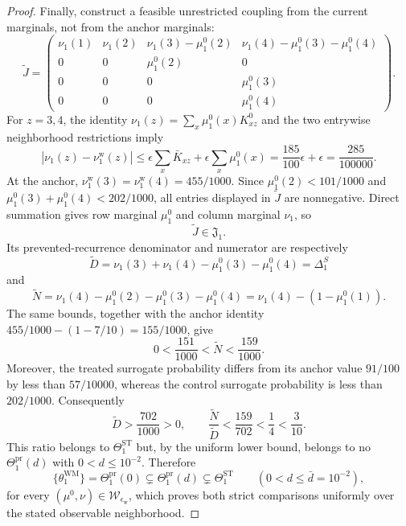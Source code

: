 \documentclass{article}
\begin{document}
\begin{proof}
Finally, construct a feasible unrestricted coupling from the current marginals, not from the anchor marginals:
\[
 \widetilde J=
 \begin{pmatrix}
 \nu_1(1)&\nu_1(2)&\nu_1(3)-\mu_1^0(2)&\nu_1(4)-\mu_1^0(3)-\mu_1^0(4)\\
 0&0&\mu_1^0(2)&0\\
 0&0&0&\mu_1^0(3)\\
 0&0&0&\mu_1^0(4)
 \end{pmatrix}.
\]
For \(z=3,4\), the identity \(\nu_1(z)=\sum_x\mu_1^0(x)K^0_{xz}\) and the two entrywise neighborhood restrictions imply
\[
 \left|\nu_1(z)-\nu_1^{\mathrm w}(z)\right|
 \le\epsilon\sum_x\bar K_{xz}+\epsilon\sum_x\mu_1^0(x)
 =\frac{185}{100}\epsilon+\epsilon
 =\frac{285}{100000}.
\]
At the anchor, \(\nu_1^{\mathrm w}(3)=\nu_1^{\mathrm w}(4)=455/1000\). Since \(\mu_1^0(2)<101/1000\) and \(\mu_1^0(3)+\mu_1^0(4)<202/1000\), all entries displayed in \(\widetilde J\) are nonnegative. Direct summation gives row marginal \(\mu_1^0\) and column marginal \(\nu_1\), so
\[
 \widetilde J\in\mathfrak J_1.
\]
Its prevented-recurrence denominator and numerator are respectively
\[
 \widetilde D=\nu_1(3)+\nu_1(4)-\mu_1^0(3)-\mu_1^0(4)=\Delta_1^S
\]
and
\[
 \widetilde N=\nu_1(4)-\mu_1^0(2)-\mu_1^0(3)-\mu_1^0(4)
 =\nu_1(4)-(1-\mu_1^0(1)).
\]
The same bounds, together with the anchor identity \(455/1000-(1-7/10)=155/1000\), give
\[
 0<\frac{151}{1000}<\widetilde N<\frac{159}{1000}.
\]
Moreover, the treated surrogate probability differs from its anchor value \(91/100\) by less than \(57/10000\), whereas the control surrogate probability is less than \(202/1000\). Consequently
\[
 \widetilde D>\frac{702}{1000}>0,
 \qquad
 \frac{\widetilde N}{\widetilde D}
 <\frac{159}{702}<\frac14<\frac3{10}.
\]
This ratio belongs to \(\Theta_1^{\mathrm{ST}}\) but, by the uniform lower bound, belongs to no \(\Theta_1^{\mathrm{pr}}(d)\) with \(0<d\le10^{-2}\). Therefore
\[
 \{\theta_1^{\mathrm{WM}}\}=\Theta_1^{\mathrm{pr}}(0)
 \subsetneq\Theta_1^{\mathrm{pr}}(d)
 \subsetneq\Theta_1^{\mathrm{ST}}
 \qquad(0<d\le\bar d=10^{-2}),
\]
for every \((\mu^0,\nu)\in\mathcal W_{\epsilon_{\mathrm w}}\), which proves both strict comparisons uniformly over the stated observable neighborhood.
\end{proof}
\end{document}
